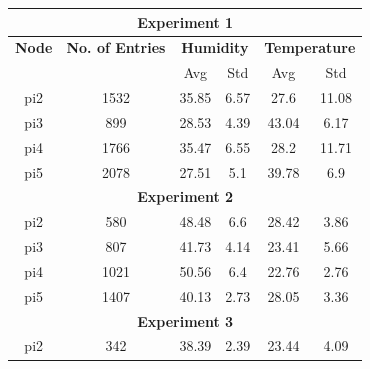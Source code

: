 \documentclass{mpaper}
\begin{document}
\begin{table}[h]
\begin{tabular}{|cccccc|}
\hline
\multicolumn{6}{|c|}{\textbf{Experiment 1}}                                                                                             \\ \hline
\multicolumn{1}{|c|}{\textbf{Node}} & \multicolumn{1}{c|}{\textbf{No. of Entries}} & \multicolumn{2}{c|}{\textbf{Humidity}}     & \multicolumn{2}{c|}{\textbf{Temperature}} \\ \hline
\multicolumn{1}{|c|}{}     & \multicolumn{1}{c|}{}               & Avg   & \multicolumn{1}{c|}{Std}  & Avg             & Std            \\
\multicolumn{1}{|c|}{pi2}  & \multicolumn{1}{c|}{1532}           & 35.85 & \multicolumn{1}{c|}{6.57} & 27.6            & 11.08          \\
\multicolumn{1}{|c|}{pi3}  & \multicolumn{1}{c|}{899}            & 28.53 & \multicolumn{1}{c|}{4.39} & 43.04           & 6.17           \\
\multicolumn{1}{|c|}{pi4}  & \multicolumn{1}{c|}{1766}           & 35.47 & \multicolumn{1}{c|}{6.55} & 28.2            & 11.71          \\
\multicolumn{1}{|c|}{pi5}  & \multicolumn{1}{c|}{2078}           & 27.51 & \multicolumn{1}{c|}{5.1}  & 39.78           & 6.9            \\ \hline
\multicolumn{6}{|c|}{\textbf{Experiment 2}}                                                                                             \\ \hline
\multicolumn{1}{|c|}{pi2}  & \multicolumn{1}{c|}{580}            & 48.48 & \multicolumn{1}{c|}{6.6}  & 28.42           & 3.86           \\
\multicolumn{1}{|c|}{pi3}  & \multicolumn{1}{c|}{807}            & 41.73 & \multicolumn{1}{c|}{4.14} & 23.41           & 5.66           \\
\multicolumn{1}{|c|}{pi4}  & \multicolumn{1}{c|}{1021}           & 50.56 & \multicolumn{1}{c|}{6.4}  & 22.76           & 2.76           \\
\multicolumn{1}{|c|}{pi5}  & \multicolumn{1}{c|}{1407}           & 40.13 & \multicolumn{1}{c|}{2.73} & 28.05           & 3.36           \\ \hline
\multicolumn{6}{|c|}{\textbf{Experiment 3}}                                                                                             \\ \hline
\multicolumn{1}{|c|}{pi2}  & \multicolumn{1}{c|}{342}            & 38.39 & \multicolumn{1}{c|}{2.39} & 23.44           & 4.09           \\

\end{tabular}
\end{table}
\end{document}
